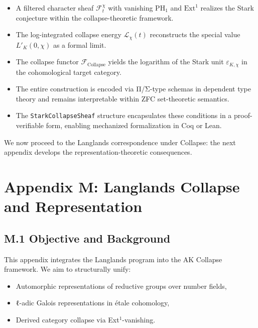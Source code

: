 \documentclass[11pt]{article}
\begin{document}
\begin{itemize}
  \item A filtered character sheaf $\mathcal{F}^\chi_t$ with vanishing $\mathrm{PH}_1$ and $\mathrm{Ext}^1$ realizes the Stark conjecture within the collapse-theoretic framework.
  \item The log-integrated collapse energy $\mathcal{L}_\chi(t)$ reconstructs the special value $L'_K(0,\chi)$ as a formal limit.
  \item The collapse functor $\mathcal{F}_{\mathrm{Collapse}}$ yields the logarithm of the Stark unit $\varepsilon_{K,\chi}$ in the cohomological target category.
  \item The entire construction is encoded via Π/Σ-type schemas in dependent type theory and remains interpretable within ZFC set-theoretic semantics.
  \item The \texttt{StarkCollapseSheaf} structure encapsulates these conditions in a proof-verifiable form, enabling mechanized formalization in Coq or Lean.
\end{itemize}

We now proceed to the Langlands correspondence under Collapse:  
the next appendix develops the representation-theoretic consequences.




\section*{Appendix M: Langlands Collapse and Representation}

\subsection*{M.1 Objective and Background}

This appendix integrates the Langlands program into the AK Collapse framework. We aim to structurally unify:

\begin{itemize}
  \item Automorphic representations of reductive groups over number fields,
  \item ℓ-adic Galois representations in étale cohomology,
  \item Derived category collapse via Ext$^1$-vanishing.
\end{itemize}
\end{document}
